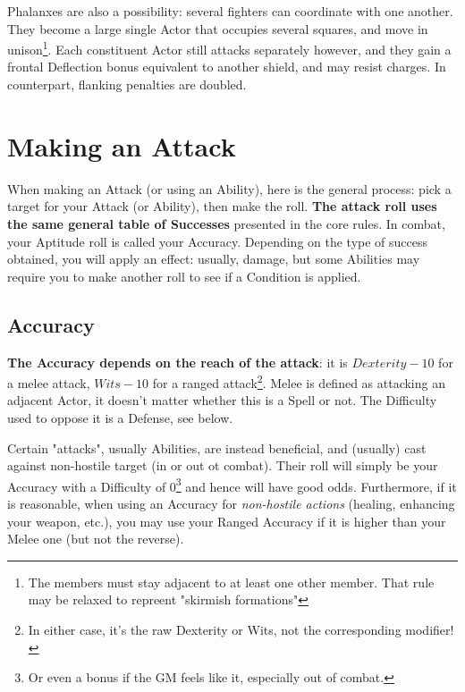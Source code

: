 Phalanxes are also a possibility: several fighters can coordinate with one another. They become a large single Actor that occupies several squares, and move in unison\footnote{The members must stay adjacent to at least one other member. That rule may be relaxed to repreent "skirmish formations"}. Each constituent Actor still attacks separately however, and they gain a frontal Deflection bonus equivalent to another shield, and may resist charges. In counterpart, flanking penalties are doubled. 


\section{Making an Attack}


When making an Attack (or using an Ability), here is the general process: pick a target for your Attack (or Ability), then make the roll. \textbf{The attack roll uses the same general table of Successes} presented in the core rules. In combat, your Aptitude roll is called your Accuracy. Depending on the type of success obtained, you will apply an effect: usually, damage, but some Abilities may require you to make another roll to see if a Condition is applied.


\subsection{Accuracy}

\label{accuracies}

\textbf{The Accuracy depends on the reach of the attack}: it is $Dexterity - 10$ for a melee attack, $Wits-10$ for a ranged attack\footnote{In either case, it's the raw Dexterity or Wits, not the corresponding modifier!}. Melee is defined as attacking an adjacent Actor, it doesn't matter whether this is a Spell or not. The Difficulty used to oppose it is a Defense, see below.

Certain "attacks", usually Abilities, are instead beneficial, and (usually) cast against non-hostile target (in or out ot combat). Their roll will simply be your Accuracy with a Difficulty of 0\footnote{Or even a bonus if the GM feels like it, especially out of combat.} and hence will have good odds. Furthermore, if it is reasonable, when using an Accuracy for \textit{non-hostile actions} (healing, enhancing your weapon, etc.), you may use your Ranged Accuracy if it is higher than your Melee one (but not the reverse).


